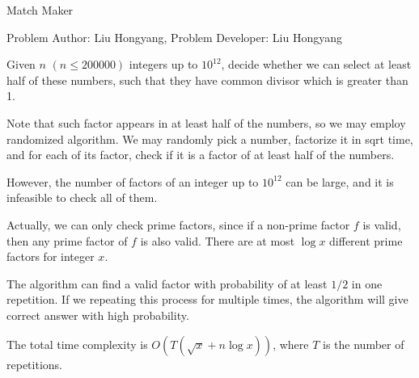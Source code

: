 \begin{Solution}{Match Maker}

\begin{frame}{\ProblemName}

\small Problem Author: Liu Hongyang, Problem Developer: Liu Hongyang \par \vspace{0.3cm}


Given $n$ $(n \leq 200000)$ integers up to $10^{12}$, decide whether we can select at least half of these numbers, such that they have common divisor which is greater than 1.

\par

Note that such factor appears in at least half of the numbers, so we may employ randomized algorithm. We may randomly pick a number, factorize it in sqrt time, and for each of its factor, check if it is a factor of at least half of the numbers.

\par

However, the number of factors of an integer up to $10^{12}$ can be large, and it is infeasible to check all of them.

\end{frame}

\begin{frame}{\ProblemName}

Actually, we can only check prime factors, since if a non-prime factor $f$ is valid, then any prime factor of $f$ is also valid. There are at most $\log x$ different prime factors for integer $x$.

\par

The algorithm can find a valid factor with probability of at least $1/2$ in one repetition. If we repeating this process for multiple times, the algorithm will give correct answer with high probability.

\par

The total time complexity is $O(T(\sqrt{x} + n \log x))$, where $T$ is the number of repetitions.

\end{frame}

\end{Solution}
